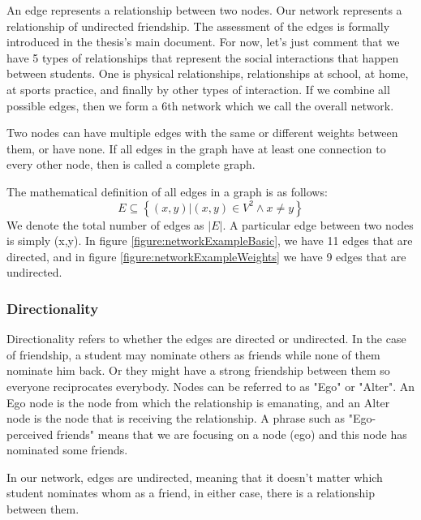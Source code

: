 An edge represents a relationship between two nodes. Our network represents a relationship of undirected friendship. The assessment of the edges is formally introduced in the thesis's main document. For now, let's just comment that we have 5 types of relationships that represent the social interactions that happen between students. One is physical relationships, relationships at school, at home, at sports practice, and finally by other types of interaction. If we combine all possible edges, then we form a 6th network which we call the overall network.

Two nodes can have multiple edges with the same or different weights between them, or have none. If all edges in the graph have at least one connection to every other node, then is called a complete graph.

The mathematical definition of all edges in a graph is as follows:
    \begin{equation}
        E \subseteq  \left\{   (x,y) | (x,y) \in V^2  \land x  \neq y  \right\}
    \end{equation}
We denote the total number of edges as $|E|$. A particular edge between two nodes is simply (x,y). In figure \ref{figure:networkExampleBasic}, we have 11 edges that are directed, and in figure \ref{figure:networkExampleWeights} we have 9 edges that are undirected.

\subsubsection{Directionality}

Directionality refers to whether the edges are directed or undirected. In the case of friendship, a student may nominate others as friends while none of them nominate him back. Or they might have a strong friendship between them so everyone reciprocates everybody. Nodes can be referred to as "Ego" or "Alter". An Ego node is the node from which the relationship is emanating, and an Alter node is the node that is receiving the relationship. A phrase such as "Ego-perceived friends" means that we are focusing on a node (ego) and this node has nominated some friends.

In our network, edges are undirected, meaning that it doesn't matter which student nominates whom as a friend, in either case, there is a relationship between them.

